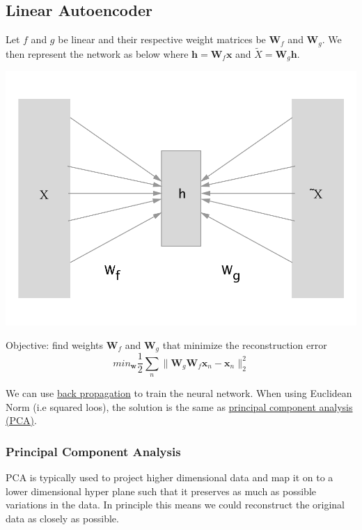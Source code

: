 \documentclass[12pt]{article}
\begin{document}
    \subsection{Linear Autoencoder}
        Let $f$ and $g$ be linear and their respective weight matrices be $\boldsymbol{W}_f$ and $\boldsymbol{W}_g$. We
        then represent the network as below where $\boldsymbol{h} = \boldsymbol{W}_f \boldsymbol{x}$ and $\tilde{X} =
        \boldsymbol{W}_g \boldsymbol{h}$.

        \begin{center}
            \includegraphics[scale=0.5]{LinearAutoEnc}
        \end{center}

        Objective: find weights $\boldsymbol{W}_f$ and $\boldsymbol{W}_g$ that minimize the reconstruction error
        $$ min_{\boldsymbol{w}} \frac{1}{2} \sum_n \| \boldsymbol{W}_g \boldsymbol{W}_f \boldsymbol{x}_n -
        \boldsymbol{x}_n \|^2_2$$

        We can use \hyperref[sec:Backprop]{back propagation} to train the neural network. When using Euclidean Norm (i.e
        squared loos), the solution is the same as \hyperref[sec:PCA]{principal component analysis (PCA)}.
    
        \subsubsection{Principal Component Analysis} \label{sec:PCA}
            PCA is typically used to project higher dimensional data and map it on to a lower dimensional hyper plane such that it
            preserves as much as possible variations in the data. In principle this means we could reconstruct the
            original data as closely as possible.
    
\end{document}
